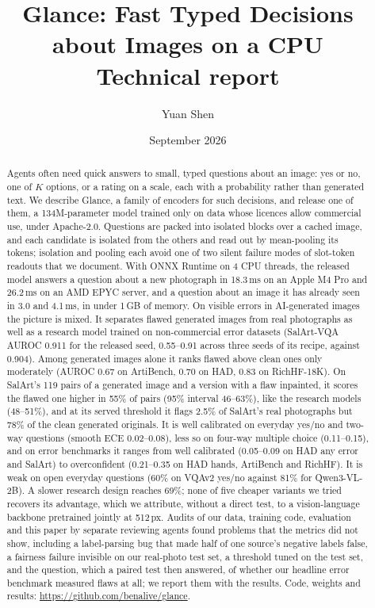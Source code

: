 \documentclass[10pt]{article}
\title{\textbf{Glance: Fast Typed Decisions about Images on a CPU}\\[4pt]
\large Technical report}
\author{Yuan Shen}
\date{September 2026}
\begin{document}
\maketitle

\begin{abstract}
Agents often need quick answers to small, typed questions about an image: yes or no, one of $K$ options, or a rating on a scale, each with a probability rather than generated text. We describe Glance, a family of encoders for such decisions, and release one of them, a 134M-parameter model trained only on data whose licences allow commercial use, under Apache-2.0. Questions are packed into isolated blocks over a cached image, and each candidate is isolated from the others and read out by mean-pooling its tokens; isolation and pooling each avoid one of two silent failure modes of slot-token readouts that we document. With ONNX Runtime on 4 CPU threads, the released model answers a question about a new photograph in 18.3\,ms on an Apple M4 Pro and 26.2\,ms on an AMD EPYC server, and a question about an image it has already seen in 3.0 and 4.1\,ms, in under 1\,GB of memory. On visible errors in AI-generated images the picture is mixed. It separates flawed generated images from real photographs as well as a research model trained on non-commercial error datasets (SalArt-VQA AUROC 0.911 for the released seed, 0.55--0.91 across three seeds of its recipe, against 0.904). Among generated images alone it ranks flawed above clean ones only moderately (AUROC 0.67 on ArtiBench, 0.70 on HAD, 0.83 on RichHF-18K). On SalArt's 119 pairs of a generated image and a version with a flaw inpainted, it scores the flawed one higher in 55\% of pairs (95\% interval 46--63\%), like the research models (48--51\%), and at its served threshold it flags 2.5\% of SalArt's real photographs but 78\% of the clean generated originals. It is well calibrated on everyday yes/no and two-way questions (smooth ECE 0.02--0.08), less so on four-way multiple choice (0.11--0.15), and on error benchmarks it ranges from well calibrated (0.05--0.09 on HAD any error and SalArt) to overconfident (0.21--0.35 on HAD hands, ArtiBench and RichHF). It is weak on open everyday questions (60\% on VQAv2 yes/no against 81\% for Qwen3-VL-2B). A slower research design reaches 69\%; none of five cheaper variants we tried recovers its advantage, which we attribute, without a direct test, to a vision-language backbone pretrained jointly at 512\,px. Audits of our data, training code, evaluation and this paper by separate reviewing agents found problems that the metrics did not show, including a label-parsing bug that made half of one source's negative labels false, a fairness failure invisible on our real-photo test set, a threshold tuned on the test set, and the question, which a paired test then answered, of whether our headline error benchmark measured flaws at all; we report them with the results. Code, weights and results: \url{https://github.com/benalive/glance}.
\end{abstract}
\end{document}
